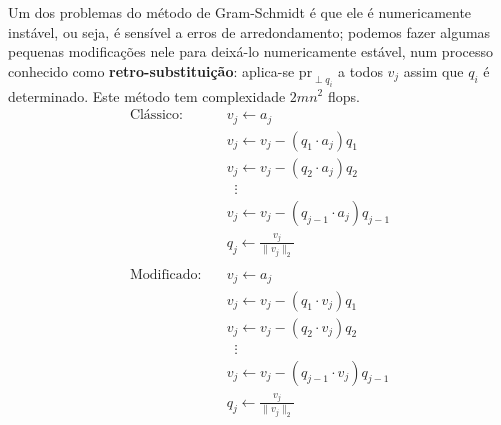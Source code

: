 \documentclass[../numerical_methods.tex]{subfiles}
\begin{document}
Um dos problemas do método de Gram-Schmidt é que ele é numericamente instável, ou seja, é sensível a erros de arredondamento; podemos fazer algumas pequenas modificações nele para deixá-lo numericamente estável, num processo conhecido como \textbf{retro-substituição}:
aplica-se \(\mathrm{pr}_{\perp q_{i}}\) a todos \(v_{j}\) assim que \(q_{i}\) é determinado. Este método tem complexidade \(2mn^{2}\) flops.
\begin{align*}
	\text{Clássico:} \quad
	 & v_j \gets a_j                               \\
	 & v_j \gets v_j - (q_1 \cdot a_j) q_1         \\
	 & v_j \gets v_j - (q_2 \cdot a_j) q_2         \\
	 & \;\;\vdots                                  \\
	 & v_j \gets v_j - (q_{j-1} \cdot a_j) q_{j-1} \\
	 & q_j \gets \frac{v_j}{\|v_j\|_2}             \\
	\\
	\text{Modificado:} \quad
	 & v_j \gets a_j                               \\
	 & v_j \gets v_j - (q_1 \cdot v_j) q_1         \\
	 & v_j \gets v_j - (q_2 \cdot v_j) q_2         \\
	 & \;\;\vdots                                  \\
	 & v_j \gets v_j - (q_{j-1} \cdot v_j) q_{j-1} \\
	 & q_j \gets \frac{v_j}{\|v_j\|_2}
\end{align*}
\end{document}
